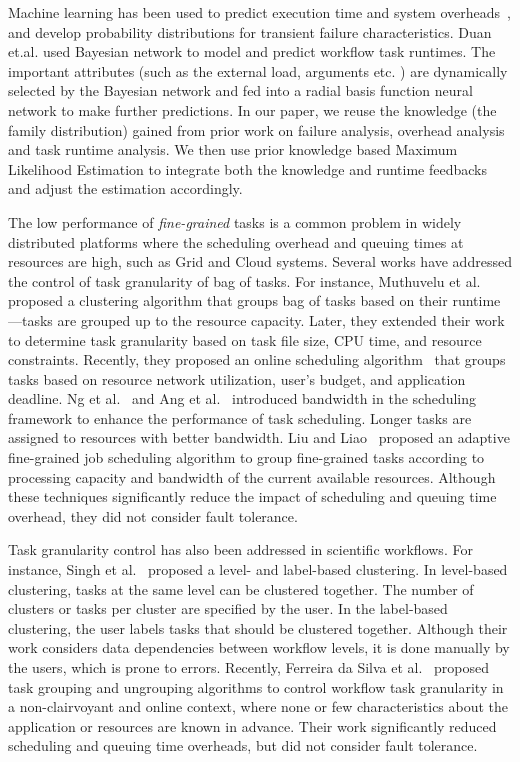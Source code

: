 \documentclass{IOS-Book-Article}
\begin{document}
Machine learning has been used to predict execution time \cite{Rubing2009, 1015660, 1542747} and system overheads~\cite{Chen2011}, and develop probability distributions for transient failure characteristics. Duan et.al. \cite{Rubing2009} used Bayesian network to model and predict workflow task runtimes. The important attributes (such as the external load, arguments etc. ) are dynamically selected by the Bayesian network and fed into a radial basis function neural network to make further predictions. In our paper, we reuse the knowledge (the family distribution) gained from prior work on failure analysis, overhead analysis and task runtime analysis. We then use prior knowledge based Maximum Likelihood Estimation to integrate both the knowledge and runtime feedbacks and adjust the estimation accordingly. 

The low performance of \emph{fine-grained} tasks is a common problem in widely distributed platforms where the scheduling overhead and queuing times at resources are high, such as Grid and Cloud systems. Several works have addressed the control of task granularity of bag of tasks. For instance, Muthuvelu et al.~\cite{Muthuvelu2005} proposed a clustering algorithm that groups bag of tasks based on their runtime---tasks are grouped up to the resource capacity. Later, they extended their work~\cite{4493929} to determine task granularity based on task file size, CPU time, and resource constraints. Recently, they proposed an online scheduling algorithm~\cite{Muthuvelu2010} that groups tasks based on resource network utilization, user's budget, and application deadline. Ng et al.~\cite{Keat2006} and Ang et al.~\cite{Ang2009} introduced bandwidth in the scheduling framework to enhance the performance of task scheduling. Longer tasks are assigned to resources with better bandwidth. Liu and Liao~\cite{Liu2009} proposed an adaptive fine-grained job scheduling algorithm to group fine-grained tasks according to processing capacity and bandwidth of the current available resources. Although these techniques significantly reduce the impact of scheduling and queuing time overhead, they did not consider fault tolerance.

Task granularity control has also been addressed in scientific workflows. For instance, Singh et al.~\cite{Singh2008} proposed a level- and label-based clustering. In level-based clustering, tasks at the same level can be clustered together. The number of clusters or tasks per cluster are specified by the user. In the label-based clustering, the user labels tasks that should be clustered together. Although their work considers data dependencies between workflow levels, it is done manually by the users, which is prone to errors. Recently, Ferreira da Silva et al.~\cite{Ferreira-granularity-2013} proposed task grouping and ungrouping algorithms to control workflow task granularity in a non-clairvoyant and online context, where none or few characteristics about the application or resources are known in advance. Their work significantly reduced scheduling and queuing time overheads, but did not consider fault tolerance.
\end{document}
